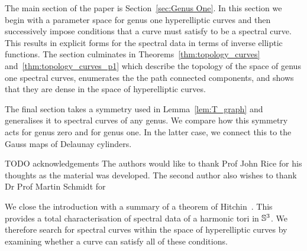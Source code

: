 \documentclass{article}
\begin{document}
The main section of the paper is Section~\ref{sec:Genus One}. In this section we begin with a parameter space for genus one hyperelliptic curves and then successively impose conditions that a curve must satisfy to be a spectral curve. This results in explicit forms for the spectral data in terms of inverse elliptic functions.
The section culminates in Theorems~\ref{thm:topology_curves} and~\ref{thm:topology_curves_p1} which describe the topology of the space of genus one spectral curves, enumerates the the path connected components, and shows that they are dense in the space of hyperelliptic curves.

The final section takes a symmetry used in Lemma~\ref{lem:T_graph} and generalises it to spectral curves of any genus. We compare how this symmetry acts for genus zero and for genus one. In the latter case, we connect this to the Gauss maps of Delaunay cylinders.



TODO acknowledgements
The authors would like to thank Prof John Rice for his thoughts as the material was developed. 
The second author also wishes to thank Dr Prof Martin Schmidt for 




We close the introduction with a summary of a theorem of Hitchin~\cite[Theorem~8.1]{Hitchin1990}. This provides a total characterisation of spectral data of a harmonic tori in $\S^3$. We therefore search for spectral curves within the space of hyperelliptic curves by examining whether a curve can satisfy all of these conditions.
\end{document}
